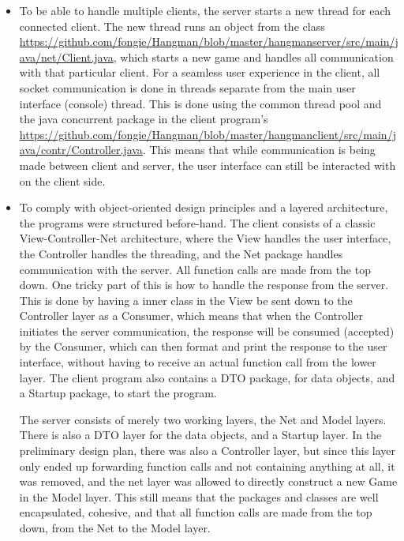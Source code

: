 \documentclass[a4paper]{scrartcl}
\begin{document}
\begin{itemize}
    \item To be able to handle multiple clients, the server starts a new thread for each connected client. The new thread runs an object from the class \href{Client}{https://github.com/fongie/Hangman/blob/master/hangmanserver/src/main/java/net/Client.java}, which starts a new game and handles all communication with that particular client. For a seamless user experience in the client, all socket communication is done in threads separate from the main user interface (console) thread. This is done using the common thread pool and the java concurrent package in the client program's \href{Controller}{https://github.com/fongie/Hangman/blob/master/hangmanclient/src/main/java/contr/Controller.java}. This means that while communication is being made between client and server, the user interface can still be interacted with on the client side.
    \item To comply with object-oriented design principles and a layered architecture, the programs were structured before-hand. The client consists of a classic View-Controller-Net architecture, where the View handles the user interface, the Controller handles the threading, and the Net package handles communication with the server. All function calls are made from the top down. One tricky part of this is how to handle the response from the server. This is done by having a inner class in the View be sent down to the Controller layer as a Consumer, which means that when the Controller initiates the server communication, the response will be consumed (accepted) by the Consumer, which can then format and print the response to the user interface, without having to receive an actual function call from the lower layer. The client program also contains a DTO package, for data objects, and a Startup package, to start the program.

        The server consists of merely two working layers, the Net and Model layers. There is also a DTO layer for the data objects, and a Startup layer. In the preliminary design plan, there was also a Controller layer, but since this layer only ended up forwarding function calls and not containing anything at all, it was removed, and the net layer was allowed to directly construct a new Game in the Model layer. This still means that the packages and classes are well encapsulated, cohesive, and that all function calls are made from the top down, from the Net to the Model layer.

\end{itemize}
\end{document}
